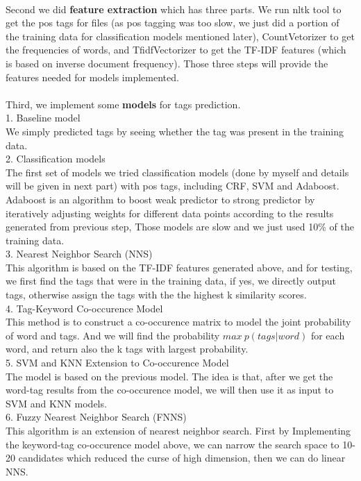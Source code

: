 \documentclass[paper=a4, fontsize=11pt]{scrartcl} %
\numberwithin{equation}{section} %
\numberwithin{figure}{section} %
\numberwithin{table}{section} %
\begin{document}
\ \\
Second we did {\bf feature extraction} which has three parts. We run nltk tool to get the pos tags for files (as pos tagging was too slow, we just did a portion of the training data for classification models mentioned later), CountVetorizer to get the frequencies of words, and TfidfVectorizer to get the TF-IDF features (which is based on inverse document frequency). Those three steps will provide the features needed for models implemented.  \\
\ \\
Third, we implement some {\bf models} for tags prediction. \\
1. Baseline model \\
We simply predicted tags by seeing whether the tag was present in the training data.\\
2. Classification models \\
The first set of models we tried classification models (done by myself and details will be given in next part) with pos tags, including CRF, SVM and Adaboost. Adaboost is an algorithm to boost weak predictor to strong predictor by iteratively adjusting weights for different data points according to the results generated from previous step, Those models are slow and we just used 10\% of the training data. \\
3. Nearest Neighbor Search (NNS) \\
This algorithm is based on the TF-IDF features generated above, and for testing, we first find the tags that were in the training data, if yes, we directly output tags, otherwise assign the tags with the the highest k similarity scores.\\
4. Tag-Keyword Co-occurence Model \\
This method is to construct a co-occurence matrix to model the joint probability of word and tags. And we will find the probability $max\ p(tags|word)$ for each word, and return also the k tags with largest probability.\\
5. SVM and KNN Extension to Co-occurence Model\\
The model is based on the previous model. The idea is that, after we get the word-tag results from the co-occurence model, we will then use it as input to SVM and KNN models.\\
6. Fuzzy Nearest Neighbor Search (FNNS) \\
This algorithm is an extension of nearest neighbor search. First by Implementing the keyword-tag co-occurence model above, we can narrow the search space to 10-20 candidates which reduced the curse of high dimension, then we can do linear NNS.\\
\end{document}
